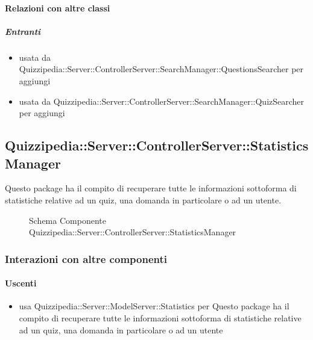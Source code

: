 \paragraph{Relazioni con altre classi}
\subparagraph{Entranti}
\begin{itemize}
\item usata da Quizzipedia::Server::ControllerServer::SearchManager::QuestionsSearcher per aggiungi
\item usata da Quizzipedia::Server::ControllerServer::SearchManager::QuizSearcher per aggiungi
\end{itemize}
\subsection{Quizzipedia::Server::ControllerServer::StatisticsManager}
Questo package ha il compito di recuperare tutte le informazioni sottoforma di statistiche relative ad un quiz, una domanda in particolare o ad un utente.
\begin{figure}[H]
\centering
\noindent{}
\caption[Schema Componente Quizzipedia::Server::ControllerServer::StatisticsManager]{Schema Componente Quizzipedia::Server::ControllerServer::StatisticsManager}
\end{figure}
\subsubsection{Interazioni con altre componenti}
\paragraph{Uscenti}
\begin{itemize}
\item usa Quizzipedia::Server::ModelServer::Statistics per Questo package ha il compito di recuperare tutte le informazioni sottoforma di statistiche relative ad un quiz, una domanda in particolare o ad un utente
\end{itemize}
